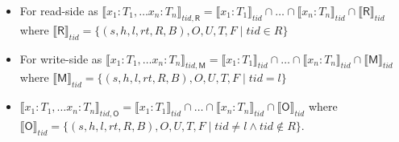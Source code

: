 \begin{itemize}
\item For read-side as $\llbracket x_1 : T_1, \ldots x_n : T_n \rrbracket_{tid,\textsf{R}} = \llbracket x_1 : T_1 \rrbracket_{tid} \cap \ldots \cap \llbracket x_n : T_n \rrbracket_{tid} \cap \llbracket \textsf{R} \rrbracket_{tid}$ where
$\llbracket \textsf{R} \rrbracket_{tid} = \{ (s,h,l,rt,R,B),O,U,T,F  \mid tid \in R \}$

\item For write-side as $\llbracket x_1 : T_1, \ldots x_n : T_n \rrbracket_{tid,\textsf{M}} = \llbracket x_1 : T_1 \rrbracket_{tid} \cap \ldots \cap \llbracket x_n : T_n \rrbracket_{tid} \cap \llbracket \textsf{M} \rrbracket_{tid}$ where
$\llbracket \textsf{M} \rrbracket_{tid} = \{ (s,h,l,rt,R,B),O,U,T,F  \mid tid = l \}$

\item $\llbracket x_1 : T_1, \ldots x_n : T_n \rrbracket_{tid,\textsf{O}} = \llbracket x_1 : T_1 \rrbracket_{tid} \cap \ldots \cap \llbracket x_n : T_n \rrbracket_{tid} \cap \llbracket \textsf{O} \rrbracket_{tid}$ where
$\llbracket \textsf{O} \rrbracket_{tid} = \{ (s,h,l,rt,R,B),O,U,T,F  \mid tid \neq l \land tid \notin R \}$.
\end{itemize}


